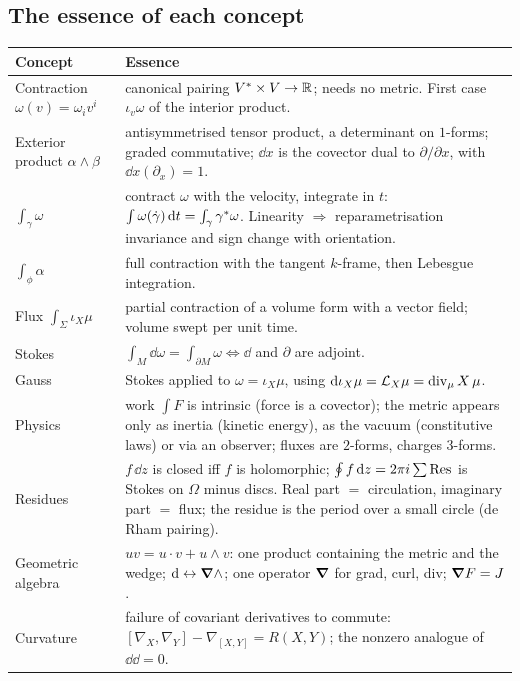 \subsection{The essence of each concept}

{\small
\renewcommand{\arraystretch}{1.3}
\begin{longtable}{@{}p{3.6cm}p{10.4cm}@{}}
\toprule
\textbf{Concept} & \textbf{Essence}\\
\midrule
\endhead
Contraction $\omega(v)=\omega_iv^i$ & canonical pairing $V^*\times V\to\mathbb{R}$; needs no metric. First case $\iota_v\omega$ of the interior product.\\
Exterior product $\alpha\wedge\beta$ & antisymmetrised tensor product, a determinant on $1$-forms; graded commutative; $\dd x$ is the covector dual to $\partial/\partial x$, with $\dd x(\partial_x)=1$.\\
$\int_\gamma\omega$ & contract $\omega$ with the velocity, integrate in $t$: $\int\omega(\dot\gamma)\,\mathrm{d} t=\int_\gamma\gamma{}^{*}\omega$. Linearity $\Rightarrow$ reparametrisation invariance and sign change with orientation.\\
$\int_\phi\alpha$ & full contraction with the tangent $k$-frame, then Lebesgue integration.\\
Flux $\int_\Sigma\iota_X\mu$ & partial contraction of a volume form with a vector field; volume swept per unit time.\\
Stokes & $\int_M\dd\omega=\int_{\partial M}\omega\iff\dd$ and $\partial$ are adjoint.\\
Gauss & Stokes applied to $\omega=\iota_X\mu$, using $\mathrm{d}\iota_X\mu=\mathcal{L}_X\mu=\operatorname{div}_\mu X\,\mu$.\\
Physics & work $\int F$ is intrinsic (force is a covector); the metric appears only as inertia (kinetic energy), as the vacuum (constitutive laws) or via an observer; fluxes are $2$-forms, charges $3$-forms.\\
Residues & $f\,\dd z$ is closed iff $f$ is holomorphic; $\oint f\,\mathrm{d} z=2\pi i\sum\operatorname{Res}$ is Stokes on $\Omega$ minus discs. Real part $=$ circulation, imaginary part $=$ flux; the residue is the period over a small circle (de Rham pairing).\\
Geometric algebra & $uv=u\cdot v+u\wedge v$: one product containing the metric and the wedge; $\mathrm{d}\leftrightarrow\boldsymbol{\nabla}\wedge$; one operator $\boldsymbol{\nabla}$ for grad, curl, div; $\boldsymbol{\nabla} F=J$.\\
Curvature & failure of covariant derivatives to commute: $[\nabla_X,\nabla_Y]-\nabla_{[X,Y]}=R(X,Y)$; the nonzero analogue of $\dd\dd=0$.\\
\bottomrule
\end{longtable}}
